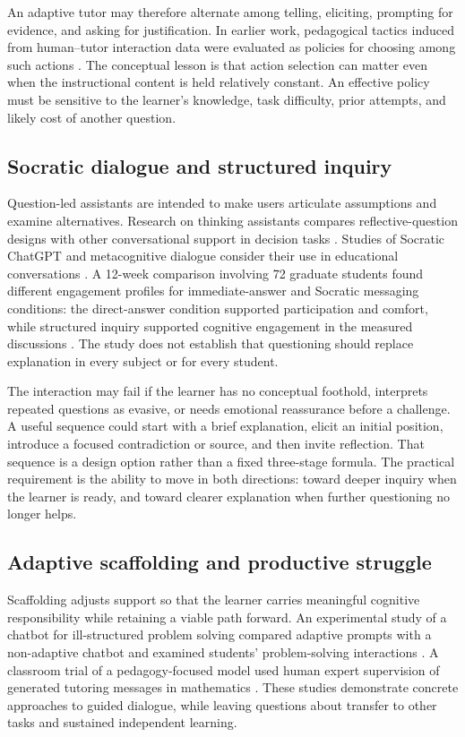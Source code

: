 \documentclass[11pt,a4paper]{article}
\begin{document}
An adaptive tutor may therefore alternate among telling, eliciting, prompting for evidence, and asking for justification. In earlier work, pedagogical tactics induced from human--tutor interaction data were evaluated as policies for choosing among such actions \cite{P07}. The conceptual lesson is that action selection can matter even when the instructional content is held relatively constant. An effective policy must be sensitive to the learner's knowledge, task difficulty, prior attempts, and likely cost of another question.

\subsection{Socratic dialogue and structured inquiry}
Question-led assistants are intended to make users articulate assumptions and examine alternatives. Research on thinking assistants compares reflective-question designs with other conversational support in decision tasks \cite{P46}. Studies of Socratic ChatGPT and metacognitive dialogue consider their use in educational conversations \cite{P10,P41}. A 12-week comparison involving 72 graduate students found different engagement profiles for immediate-answer and Socratic messaging conditions: the direct-answer condition supported participation and comfort, while structured inquiry supported cognitive engagement in the measured discussions \cite{P25}. The study does not establish that questioning should replace explanation in every subject or for every student.

The interaction may fail if the learner has no conceptual foothold, interprets repeated questions as evasive, or needs emotional reassurance before a challenge. A useful sequence could start with a brief explanation, elicit an initial position, introduce a focused contradiction or source, and then invite reflection. That sequence is a design option rather than a fixed three-stage formula. The practical requirement is the ability to move in both directions: toward deeper inquiry when the learner is ready, and toward clearer explanation when further questioning no longer helps.

\subsection{Adaptive scaffolding and productive struggle}
Scaffolding adjusts support so that the learner carries meaningful cognitive responsibility while retaining a viable path forward. An experimental study of a chatbot for ill-structured problem solving compared adaptive prompts with a non-adaptive chatbot and examined students' problem-solving interactions \cite{P06}. A classroom trial of a pedagogy-focused model used human expert supervision of generated tutoring messages in mathematics \cite{P04}. These studies demonstrate concrete approaches to guided dialogue, while leaving questions about transfer to other tasks and sustained independent learning.
\end{document}
